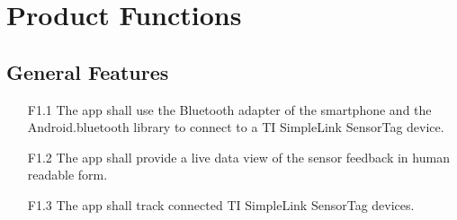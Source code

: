 \section{Product Functions}


\subsection{General Features}
\begin{itemize}
  \item[F1.1] The app shall use the Bluetooth adapter of the smartphone and the Android.bluetooth library to connect to a TI SimpleLink SensorTag device.
  \item[F1.2] The app shall provide a live data view of the sensor feedback in human readable form.
  \item[F1.3] The app shall track connected TI SimpleLink SensorTag devices.
\end{itemize}

